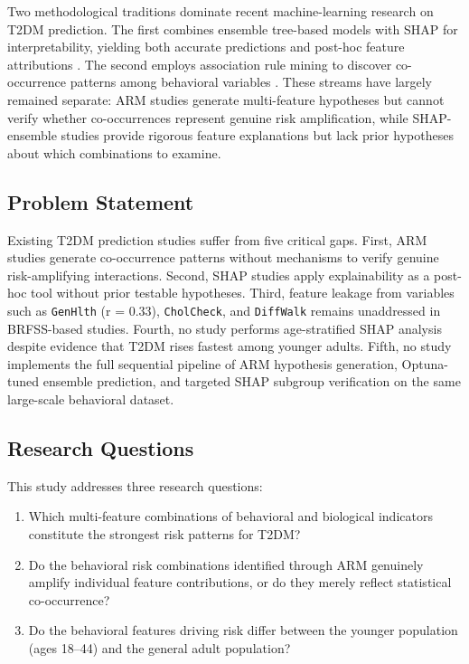 ﻿\documentclass[12pt,a4paper]{article}
\begin{document}
Two methodological traditions dominate recent machine-learning research on T2DM prediction.
The first combines ensemble tree-based models with SHAP for interpretability, yielding both
accurate predictions and post-hoc feature attributions \citep{Majcherek2025, Kutlu2024,
Netayawijit2025, Ahmed2024, Rafie2025, Islam2024}. The second employs association rule
mining to discover co-occurrence patterns among behavioral variables \citep{Fakir2024,
Bata2025}. These streams have largely remained separate: ARM studies generate multi-feature
hypotheses but cannot verify whether co-occurrences represent genuine risk amplification,
while SHAP-ensemble studies provide rigorous feature explanations but lack prior hypotheses
about which combinations to examine.

\subsection{Problem Statement}

Existing T2DM prediction studies suffer from five critical gaps. First, ARM studies generate
co-occurrence patterns without mechanisms to verify genuine risk-amplifying interactions.
Second, SHAP studies apply explainability as a post-hoc tool without prior testable
hypotheses. Third, feature leakage from variables such as \texttt{GenHlth} (r = 0.33),
\texttt{CholCheck}, and \texttt{DiffWalk} remains unaddressed in BRFSS-based studies.
Fourth, no study performs age-stratified SHAP analysis despite evidence that T2DM rises
fastest among younger adults. Fifth, no study implements the full sequential pipeline of
ARM hypothesis generation, Optuna-tuned ensemble prediction, and targeted SHAP subgroup
verification on the same large-scale behavioral dataset.

\subsection{Research Questions}

This study addresses three research questions:
\begin{enumerate}
    \item Which multi-feature combinations of behavioral and biological indicators constitute
    the strongest risk patterns for T2DM?
    \item Do the behavioral risk combinations identified through ARM genuinely amplify
    individual feature contributions, or do they merely reflect statistical co-occurrence?
    \item Do the behavioral features driving risk differ between the younger population
    (ages 18--44) and the general adult population?
\end{enumerate}
\end{document}

